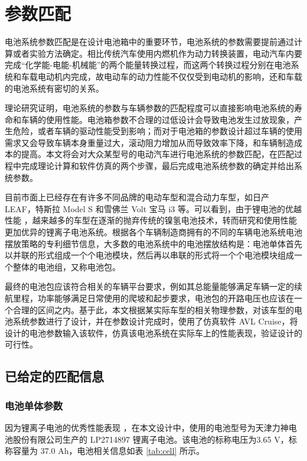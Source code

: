 
\chapter{参数匹配}
\label{chap:calculation}

电池系统参数匹配是在设计电池箱中的重要环节，电池系统的参数需要提前通过计算或者实验方法确定。相比传统汽车使用内燃机作为动力转换装置，电动汽车内要完成“化学能-电能-机械能”的两个能量转换过程，而这两个转换过程分别在电池系统和车载电动机内完成，故电动车的动力性能不仅仅受到电动机的影响，还和车载的电池系统有密切的关系。

理论研究证明，电池系统的参数与车辆参数的匹配程度可以直接影响电池系统的寿命和车辆的使用性能。电池箱参数不合理的过低设计会导致电池发生过放现象，产生危险，或者车辆的驱动性能受到影响；而对于电池箱的参数设计超过车辆的使用需求又会导致车辆本身重量过大，滚动阻力增加从而导致效率下降，和车辆制造成本的提高。本文将会对大众某型号的电动汽车进行电池系统的参数匹配，在匹配过程中完成理论计算和软件仿真的两个步骤，最后完成电池系统参数的确定并给出系统参数。

目前市面上已经存在有许多不同品牌的电动车型和混合动力车型，如日产 LEAF，特斯拉 Model S 和雪佛兰 Volt 宝马 i3 等。可以看到，由于锂电池的优越性能 \cite{王艺颖2017锂电池的发展现状及与镍氢电池的比较}，越来越多的车型在逐渐的抛弃传统的镍氢电池技术，转而研究和使用性能更加优异的锂离子电池系统。根据各个车辆制造商拥有的不同的车辆电池系统电池摆放策略的专利细节信息，大多数的电池系统中的电池摆放结构是：电池单体首先以并联的形式组成一个个电池模块，然后再以串联的形式将一个个电池模块组成一个整体的电池组，又称电池包。

最终的电池包应该符合相关的车辆平台要求，例如其总能量能够满足车辆一定的续航里程，功率能够满足日常使用的爬坡和起步要求，电池包的开路电压也应该在一个合理的区间之内。基于此，本文根据某实际车型的相关物理参数，对该车型的电池系统参数进行了设计，并在参数设计完成时，使用了仿真软件 AVL Cruise，将设计的电池参数输入该软件，仿真该电池系统在实际车上的性能表现，验证设计的可行性。

\section{已给定的匹配信息}

\subsection{电池单体参数}
因为锂离子电池的优秀性能表现 \cite{赵金龙2014增程式电动汽车动力系统参数匹配及能量管理策略研究}，在本文设计中，使用的电池型号为天津力神电池股份有限公司生产的 LP2714897 锂离子电池。该电池的标称电压为3.65 V，标称容量为 37.0 Ah，电池相关信息如表 \ref{tab:cell} 所示。

